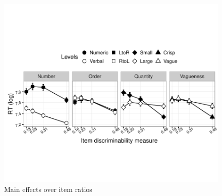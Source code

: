 \documentclass[a4paper,12pt]{article}\usepackage[]{graphicx}\usepackage[]{color}
\makeatletter
\def\maxwidth{ %
  \ifdim\Gin@nat@width>\linewidth
    \linewidth
  \else
    \Gin@nat@width
  \fi
}
\newenvironment{knitrout}{}{} %
\makeatother
\begin{document}
\clearpage

\begin{knitrout}\scriptsize
{}\color{fgcolor}\begin{figure}[hbtp]

{\centering \includegraphics[width=\maxwidth]{figure/graphics-mainD-1} 

}

\caption[Main effects over item ratios]{Main effects over item ratios}\label{fig:mainD}
\end{figure}


\end{knitrout}

\clearpage
\end{document}
